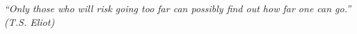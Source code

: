 \begin{epigrafe}
    \vspace*{\fill}
	\begin{flushright}
    
		\textit{``Only those who will risk going too far can possibly find out how far one can go.''\\
		(T.S. Eliot)}
	\end{flushright}
\end{epigrafe}
